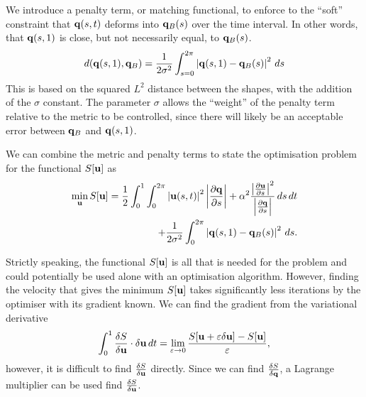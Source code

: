 \documentclass[a4paper, 12pt]{article}
\begin{document}
We introduce a penalty term, or matching functional, to enforce to the ``soft''
constraint that $\mathbf{q}(s,t)$ deforms into $\mathbf{q}_B(s)$ over the time
interval. In other words, that $\mathbf{q}(s,1)$ is close, but not necessarily
equal, to $\mathbf{q}_B(s)$.
\begin{equation}
  \label{eq:penalty}
  d(\mathbf{q}(s,1),\mathbf{q}_B) = \frac{1}{2\sigma^2}\int^{2\pi}_{s=0}\left| \mathbf{q}(s,1) -
    \mathbf{q}_B(s)\right|^2\,ds
\end{equation}
This is based on the squared $L^2$ distance between the shapes, with the
addition of the $\sigma$ constant. The parameter $\sigma$ allows the
``weight'' of the penalty term relative to the metric to be controlled,
since there will likely be an acceptable error between $\mathbf{q}_B$ and $\mathbf{q}(s,1)$.

We can combine the metric  and penalty  terms to
state the optimisation problem for the functional $S[\mathbf{u}]$ as
\begin{equation}
  \begin{split}
  \label{eq:S}
  \min_{\mathbf{u}} S[\mathbf{u}] = \frac{1}{2} \int^{1}_{0} \int^{2\pi}_{0}\left| \mathbf{u}(s,t) \right|^2 
  \left| \frac{\partial \mathbf{q}}{\partial s} \right|  + 
  \alpha^2 \frac{ 
    \left| \frac{\partial \mathbf{u}}{\partial s}\right|^2}{
    \left| \frac{\partial \mathbf{q}}{\partial s}\right|} \,ds\,dt \\
  + \frac{1}{2\sigma^2}\int^{2\pi}_{0}\left| \mathbf{q}(s,1) - \mathbf{q}_B(s)\right|^2\,ds.
  \end{split}
\end{equation}

Strictly speaking, the functional $S[\mathbf{u}]$ is all that is needed for the problem and
could potentially be used alone with an optimisation algorithm. However, finding the
velocity that gives the minimum $S[\mathbf{u}]$ takes significantly less iterations by the
optimiser with its gradient known. We can find the gradient from the variational derivative
\begin{equation}
  \label{eq:lim_dS}
  \int^1_0 \frac{\delta S}{\delta \mathbf{u}}\cdot \delta \mathbf{u}\,dt = 
  \lim_{\varepsilon \rightarrow 0} \frac{S[\mathbf{u} + \varepsilon \delta \mathbf{u}] - S[\mathbf{u}]}{\varepsilon},
\end{equation}
however, it is difficult to find $\frac{\delta S}{\delta \mathbf{u}}$ directly. Since we can find
$\frac{\delta S}{\delta \mathbf{q}}$, a Lagrange multiplier can be used find $\frac{\delta S}{\delta \mathbf{u}}$.
\end{document}
